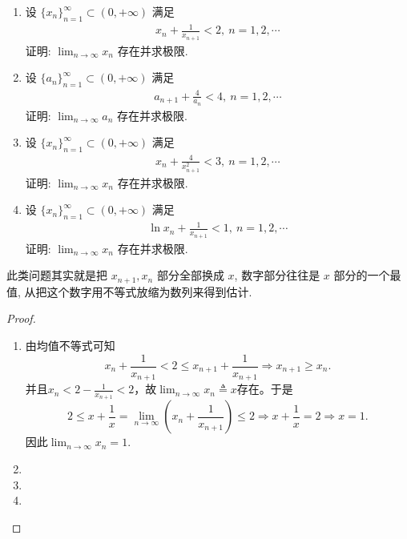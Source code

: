 \documentclass[../../main.tex]{subfiles}
\begin{document}
\begin{example}
\begin{enumerate}
\item 设 $\{x_n\}_{n=1}^{\infty} \subset (0,+\infty)$ 满足
\begin{align*}
x_n + \frac{1}{x_{n+1}} < 2,\ n = 1,2,\cdots
\end{align*}
证明: $\lim_{n \to \infty} x_n$ 存在并求极限.
\item 设 $\{a_n\}_{n=1}^{\infty} \subset (0,+\infty)$ 满足
\begin{align*}
a_{n+1} + \frac{4}{a_n} < 4,\ n = 1,2,\cdots
\end{align*}
证明: $\lim_{n \to \infty} a_n$ 存在并求极限.
\item 设 $\{x_n\}_{n=1}^{\infty} \subset (0,+\infty)$ 满足
\begin{align*}
x_n + \frac{4}{x_{n+1}^2} < 3,\ n = 1,2,\cdots
\end{align*}
证明: $\lim_{n \to \infty} x_n$ 存在并求极限.
\item 设 $\{x_n\}_{n=1}^{\infty} \subset (0,+\infty)$ 满足
\begin{align*}
\ln x_n + \frac{1}{x_{n+1}} < 1,\ n = 1,2,\cdots
\end{align*}
证明: $\lim_{n \to \infty} x_n$ 存在并求极限.
\end{enumerate}
\end{example}
\begin{note}
此类问题其实就是把 $x_{n+1}, x_n$ 部分全部换成 $x$, 数字部分往往是 $x$ 部分的一个最值, 从把这个数字用不等式放缩为数列来得到估计.
\end{note}
\begin{proof}
\begin{enumerate}
\item 由均值不等式可知
$$x_n + \frac{1}{x_{n+1}} < 2 \leqslant x_{n+1} + \frac{1}{x_{n+1}} \Rightarrow x_{n+1} \geqslant x_n.$$
并且$x_n < 2 - \frac{1}{x_{n+1}} < 2$，故$\lim_{n \to \infty} x_n \triangleq x$存在。于是
$$2 \leqslant x + \frac{1}{x} = \lim_{n \to \infty} \left( x_n + \frac{1}{x_{n+1}} \right) \leqslant 2 \Rightarrow x + \frac{1}{x} = 2 \Rightarrow x = 1.$$
因此$\lim_{n \to \infty} x_n = 1.$

\item 

\item 

\item 
\end{enumerate}

\end{proof}
\end{document}
